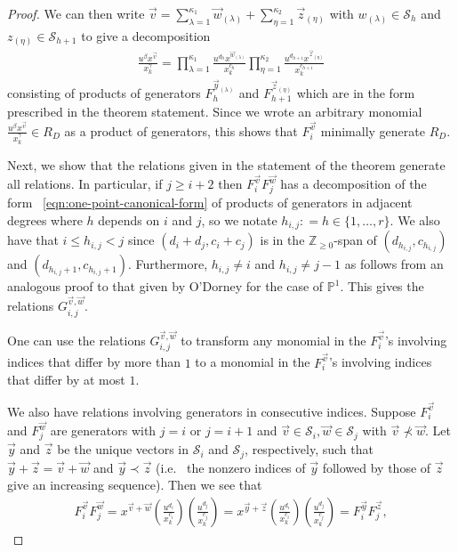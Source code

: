 \documentclass{amsart}
\theoremstyle{plain}
\theoremstyle{definition}
\theoremstyle{remark}
\numberwithin{equation}{section}
\newcommand\bp{{\mathbb P}}
\newcommand\bz{{\mathbb Z}}
\newcommand\mss{\mathscr{S}}
\begin{document}
\begin{proof}
\noindent
We can then write $\vec{v}  = \sum_{\lambda=1}^{\kappa_1}\vec{w}_{(\lambda)} +
\sum_{\eta=1}^{\kappa_2} \vec z_{(\eta)}$ with $w_{(\lambda)} \in \mss_h$ and
$z_{(\eta)} \in \mss_{h+1}$ to give a decomposition
\begin{align}
\label{eqn:one-point-canonical-form}
	\frac{u^{\beta} x^{\vec{v}}} {x_k^{\gamma}}	= \prod_{\lambda = 1}
	^{\kappa_1} \frac{u^{d_h} x^{\vec{w}_{(\lambda)}}} {x_k^{c_h}}
	\prod_{\eta = 1}^{\kappa_2} \frac{u^{d_{h + 1}} x^{\vec{z}_{(\eta)}}}
	{x_k^{c_{h + 1}}}
\end{align}
\noindent
consisting of products of generators $F_h^{\vec{y}_{(\lambda)}}$
and $F_{h + 1}^{\vec{z}_{(\eta)}}$ which are in the form
prescribed in the theorem statement. Since we wrote an arbitrary monomial
$\frac{u^{\beta} x^{\vec{v}}}{x_k^\gamma} \in R_D$ as a product of generators,
this shows that $F_i^{\vec v}$ minimally generate $R_D$.

Next, we show that the relations given in the statement of the theorem generate all relations. 
In particular, if $j \geq i + 2$ then $F_i^{\vec{v}} F_j^{\vec{w}}$
has a decomposition of the form ~\eqref{eqn:one-point-canonical-form} of 
products of generators in adjacent degrees where $h$
depends on $i$ and $ j$, so we notate $h_{i, j} \colon = h \in \{1, \ldots, r\}$. We 
also have that $i \leq h_{i, j} < j$ since $(d_i + d_j, c_i + c_j)$ is in the
$\bz_{\geq 0}$-span of $(d_{h_{i, j}}, c_{h_{i, j}})$ and
$(d_{h_{i, j} + 1}, c_{h_{i, j} + 1})$. Furthermore,
$h_{i, j} \neq i$ and $h_{i, j} \neq j - 1$
as follows from an analogous proof to that given by O'Dorney
\cite[Theorem 6]{dorney:canonical} for the case of
$\bp^1$. This gives the relations
$G_{i, j}^{\vec{v}, \vec{w}}$.

One can use the relations $G_{i, j}^{\vec{v}, \vec{w}}$
to transform any monomial in the $F_i^{\vec{v}}$'s involving
indices that differ by more than $1$ to a monomial in the $F_i
^{\vec{v}}$'s involving indices that differ by at most $1$.

We also have relations involving generators in consecutive
indices. Suppose $F_i^{\vec{v}}$ and $F_j^{\vec{w}}$ are
generators with $j = i$ or $j = i + 1$ and $\vec{v} \in
\mss_i, \vec{w} \in \mss_j$ with $\vec{v} \not\prec \vec{w}$.
Let $\vec{y}$ and $\vec{z}$ be the unique vectors in $\mss_i$ and
$\mss_j$, respectively, such that $\vec{y} + \vec{z} = \vec{v} +
\vec{w}$ and $\vec{y} \prec \vec{z}$ (i.e.~ the nonzero indices
of $\vec{y}$ followed by those of $\vec{z}$ give an increasing
sequence). Then we see that
\begin{align*}
	F_i^{\vec{v}} F_j^{\vec{w}} = x^{\vec{v} + \vec{w}}
	\left(\frac{u^{d_i}}{x_k^{c_i}}\right)
	\left(\frac{u^{d_j}}{x_k^{c_j}}\right)
	= x^{\vec{y} + \vec{z}}
	\left(\frac{u^{d_i}}{x_k^{c_i}}\right)
	\left(\frac{u^{d_j}}{x_k^{c_j}}\right)
	= F_i^{\vec{y}} F_j^{\vec{z}},
\end{align*}


\end{proof}
\end{document}
